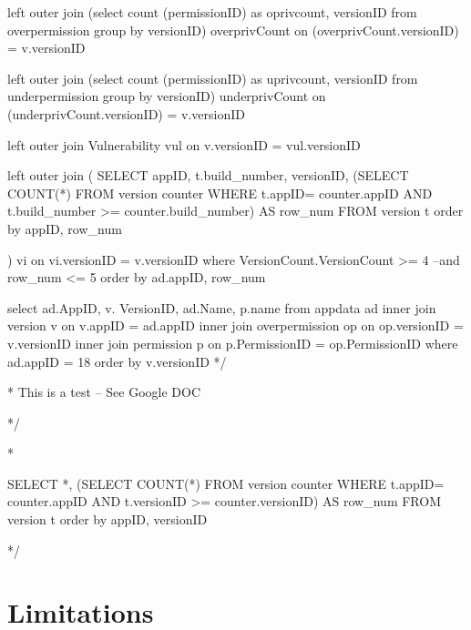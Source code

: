 \documentclass{sig-alternate}
\begin{document}
left outer join (select count (permissionID) as oprivcount, versionID from overpermission group by versionID) overprivCount on (overprivCount.versionID) = v.versionID

left outer join (select count (permissionID) as uprivcount, versionID from underpermission group by versionID) underprivCount on (underprivCount.versionID) = v.versionID

left outer join Vulnerability vul on v.versionID = vul.versionID

left outer join
(
	SELECT appID, t.build_number, versionID, (SELECT COUNT(*) FROM version counter
           WHERE t.appID= counter.appID AND t.build_number >= counter.build_number) AS row_num
	FROM version t
	order by appID, row_num

) vi on vi.versionID = v.versionID
where VersionCount.VersionCount >= 4
--and row_num <= 5
order by ad.appID, row_num






%	


select ad.AppID, v. VersionID, ad.Name, p.name
from appdata ad
inner join version v on v.appID = ad.appID
inner join overpermission op on op.versionID = v.versionID
inner join permission p on p.PermissionID = op.PermissionID
where ad.appID = 18
order by v.versionID
*/

\/* This is a test
-- See Google DOC

*/




\/* 

SELECT *, (SELECT COUNT(*) FROM version counter 
           WHERE t.appID= counter.appID AND t.versionID >= counter.versionID) AS row_num
FROM version t
order by appID, versionID








*/

\section{Limitations}
\label{sec: limitations}

\end{document}
